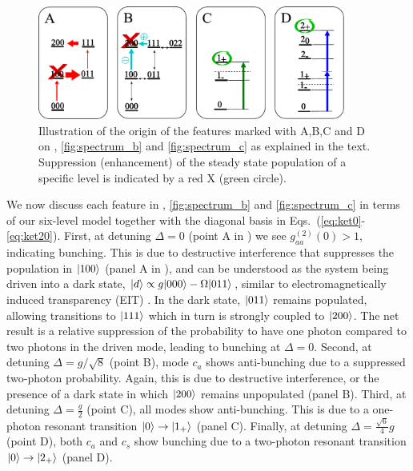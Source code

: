 \begin{figure}
\centering
  \includegraphics[width=0.9\textwidth]{./figs_Komar2013/fig2d.pdf}
  \caption{
  \label{fig:spectrum_d}
  Illustration of the origin of the features marked with A,B,C and D on
  , \ref{fig:spectrum_b} and \ref{fig:spectrum_c} as
  explained in the text.
  Suppression  (enhancement) of the
  steady state population of a specific level is
  indicated by a red X (green circle).
  }
\end{figure}
We now discuss each feature
in , \ref{fig:spectrum_b} and \ref{fig:spectrum_c} in
terms of our six-level model together with the diagonal basis
in Eqs.~(\ref{eq:ket0}-\ref{eq:ket20}).
First, at 
detuning $\Delta = 0$ (point A in )
we see $g^{(2)}_{aa}(0)>1$, indicating bunching.  
This is due to destructive interference that
suppresses
the population in  $| 100 \rangle$ 
(panel A in ), and
can be understood as the system being
driven into a dark state,
$| d \rangle \propto g | 000 \rangle - \Omega | 011 \rangle$, similar to
electromagnetically induced 
transparency (EIT) \cite{Lukin2003, Weis2010}.
In the dark state, $| 011 \rangle$ remains populated,
allowing transitions to $| 111 \rangle$
which in turn is strongly coupled to
$| 200 \rangle$.
The net result is a relative 
suppression of the probability to have one photon
compared to two photons
in the driven mode, 
leading to bunching at $\Delta = 0$.
Second, at detuning $\Delta = g/\sqrt{8}$ 
(point B), 
mode $c_a$ shows anti-bunching
due to a suppressed two-photon probability.
Again, this is due to destructive interference, or
the presence of a dark state in which
$| 200 \rangle$ remains unpopulated
(panel B).
Third, at detuning $\Delta = \frac{g}{2}$ 
(point C), 
all  modes show anti-bunching.
This is due to
a one-photon  resonant transition
$| 0 \rangle \rightarrow | 1_+ \rangle$ 
(panel C).
Finally, at detuning $\Delta = \frac{\sqrt{6}}{4}g$ 
(point D), 
both $c_a$ and $c_s$ show bunching due
to a two-photon resonant transition
$| 0 \rangle \rightarrow | 2_+ \rangle$
(panel D).



